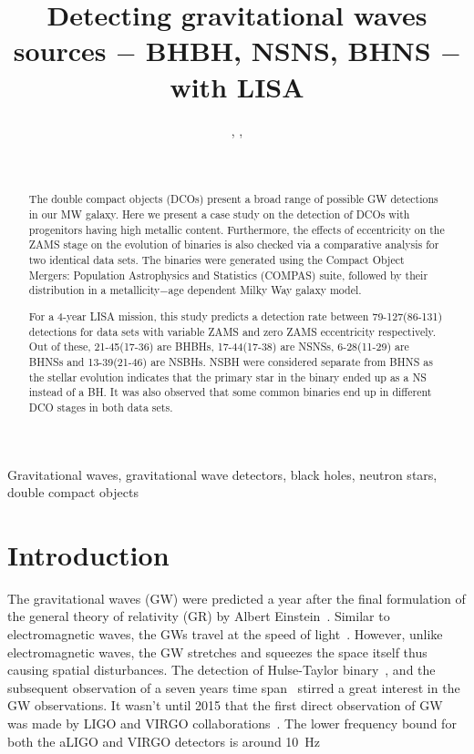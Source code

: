 \documentclass[journal, twocolumns]{IEEEtran}
\title{Detecting gravitational waves sources $-$ BHBH, NSNS, BHNS $-$ with LISA}
\author{
    \IEEEauthorblockN{Nazeela Aimen},
    \IEEEauthorblockN{Syed Ali Mohsin Bukhari},
    \IEEEauthorblockN{Asad Ali}
    \and\\
    \IEEEauthorblockA{
        \textit{
            Department of Applied Mathematics and Statistics, Institute of Space Technology, Islamabad 44000, Pakistan.
        }\\
    }
    \IEEEauthorblockA{
        \textit{
            Space and Astrophysics Research Lab (SARL), Institute of Space Technology, Islamabad 44000, Pakistan.
        }
    }
}
\begin{document}
    \maketitle
    \IEEEpeerreviewmaketitle
    \begin{abstract}
        The double compact objects (DCOs) present a broad range of possible GW detections in our MW galaxy. Here we present a case study on the detection of DCOs with progenitors having high metallic content. Furthermore, the effects of eccentricity on the ZAMS stage on the evolution of binaries is also checked via a comparative analysis for two identical data sets. The binaries were generated using the Compact Object Mergers: Population Astrophysics and Statistics (COMPAS) suite, followed by their distribution in a metallicity$-$age dependent Milky Way galaxy model.
        
        For a 4-year LISA mission, this study predicts a detection rate between 79-127(86-131) detections for data sets with variable ZAMS and zero ZAMS eccentricity respectively. Out of these, 21-45(17-36) are BHBHs, 17-44(17-38) are NSNSs, 6-28(11-29) are BHNSs and 13-39(21-46) are NSBHs.
        NSBH were considered separate from BHNS as the stellar evolution indicates that the primary star in the binary ended up as a NS instead of a BH.
        It was also observed that some common binaries end up in different DCO stages in both data sets.
	\end{abstract}
    \begin{IEEEkeywords}
        Gravitational waves, gravitational wave detectors, black holes, neutron stars, double compact objects
    \end{IEEEkeywords}



    \section{Introduction}
    \label{sec:intro}
    The gravitational waves (GW) were predicted a year after the final formulation of the general theory of relativity (GR) by Albert Einstein~\cite{Einstein1916}.
    Similar to electromagnetic waves, the GWs travel at the speed of light~\citep{Eddington1922, Abott2017}.
    However, unlike electromagnetic waves, the GW stretches and squeezes the space itself thus causing spatial disturbances.
    The detection of Hulse-Taylor binary~\citep{Hulse1975}, and the subsequent observation of a seven years time span~\citep{Taylor1982} stirred a great interest in the GW observations.
    It wasn't until 2015 that the first direct observation of GW was made by LIGO and VIRGO collaborations~\citep{Abott2017}.
    The lower frequency bound for both the aLIGO and VIRGO detectors is around \SI{10}{\hertz}~\cite{aLIGO2015, aVIRGO2014}
\end{document}
